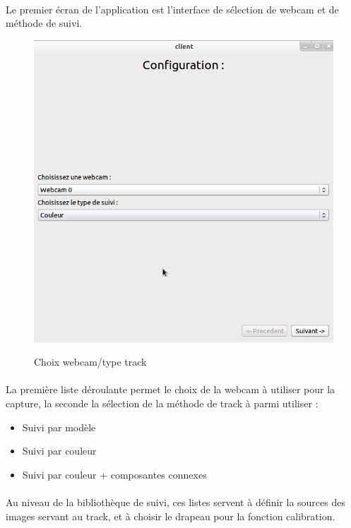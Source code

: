 \documentclass{report}
\begin{document}
				\paragraph{}
				Le premier écran de l'application est l'interface de sélection de webcam et de méthode de suivi.\\
				\begin{figure}[!h]
						\centering
						\includegraphics[scale=0.35]{../images/Capture6.png}\\
						\caption{Choix webcam/type track}
						\label{Choix webcam/type track}
				\end{figure}
				\paragraph{}
				La première liste déroulante permet le choix de la webcam à utiliser pour la capture, la seconde la sélection de la méthode de track à parmi utiliser :
				\begin{itemize}
					\item Suivi par modèle
					\item Suivi par couleur
					\item Suivi par couleur + composantes connexes
				\end{itemize}
				\paragraph{}
				Au niveau de la bibliothèque de suivi, ces listes servent à définir la sources des images servant au track, et à choisir le drapeau pour la fonction calibration.
				\newpage
\end{document}

